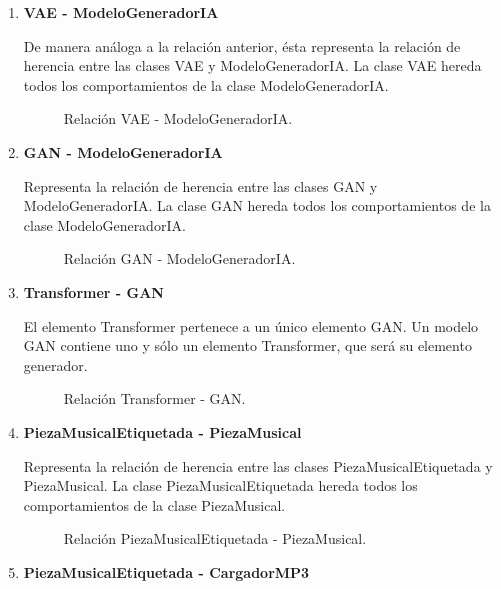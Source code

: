 \begin{enumerate}
  \item \textbf{VAE - ModeloGeneradorIA}

  De manera análoga a la relación anterior, ésta representa la relación de herencia entre las clases VAE y ModeloGeneradorIA. La clase VAE hereda todos los comportamientos de la clase ModeloGeneradorIA.

  \begin{figure}[H]
    \centering
    
    \caption{Relación VAE - ModeloGeneradorIA.}
  \end{figure}

  \item \textbf{GAN - ModeloGeneradorIA}

  Representa la relación de herencia entre las clases GAN y ModeloGeneradorIA. La clase GAN hereda todos los comportamientos de la clase ModeloGeneradorIA.

  \begin{figure}[H]
    \centering
    
    \caption{Relación GAN - ModeloGeneradorIA.}
  \end{figure}

  \item \textbf{Transformer - GAN}

  El elemento Transformer pertenece a un único elemento GAN. Un modelo GAN contiene uno y sólo un elemento Transformer, que será su elemento generador.

  \begin{figure}[H]
    \centering
    
    \caption{Relación Transformer - GAN.}
  \end{figure}

  \item \textbf{PiezaMusicalEtiquetada - PiezaMusical}

  Representa la relación de herencia entre las clases PiezaMusicalEtiquetada y PiezaMusical. La clase PiezaMusicalEtiquetada hereda todos los comportamientos de la clase PiezaMusical.

  \begin{figure}[H]
    \centering
    
    \caption{Relación PiezaMusicalEtiquetada - PiezaMusical.}
  \end{figure}

  \item \textbf{PiezaMusicalEtiquetada - CargadorMP3}


\end{enumerate}
